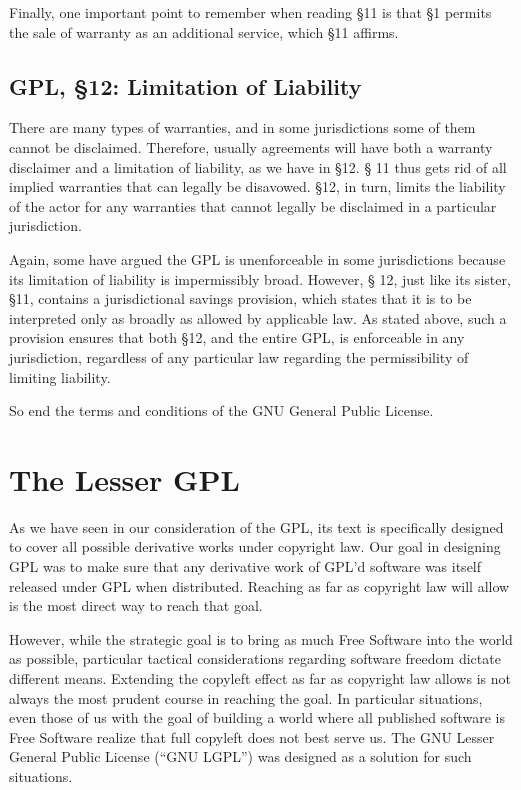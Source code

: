 \documentclass[11pt, letterpaper]{book}
\begin{document}
Finally, one important point to remember when reading \S 11 is that \S 1
permits the sale of warranty as an additional service, which \S 11 affirms.

\section{GPL, \S 12: Limitation of Liability}
\label{GPLs12}

There are many types of warranties, and in some jurisdictions some of them
cannot be disclaimed. Therefore, usually agreements will have both a
warranty disclaimer and a limitation of liability, as we have in \S 12. \S
11 thus gets rid of all implied warranties that can legally be
disavowed. \S 12, in turn, limits the liability of the actor for any
warranties that cannot legally be disclaimed in a particular jurisdiction.

Again, some have argued the GPL is unenforceable in some jurisdictions
because its limitation of liability is impermissibly broad. However, \S
12, just like its sister, \S 11, contains a jurisdictional savings
provision, which states that it is to be interpreted only as broadly as
allowed by applicable law. As stated above, such a provision ensures that
both \S 12, and the entire GPL, is enforceable in any jurisdiction,
regardless of any particular law regarding the permissibility of limiting
liability.

So end the terms and conditions of the GNU General Public License.

\chapter{The Lesser GPL}

As we have seen in our consideration of the GPL, its text is specifically
designed to cover all possible derivative works under copyright law. Our
goal in designing GPL was to make sure that any derivative work of GPL'd
software was itself released under GPL when distributed. Reaching as far
as copyright law will allow is the most direct way to reach that goal.

However, while the strategic goal is to bring as much Free Software
into the world as possible, particular tactical considerations
regarding software freedom dictate different means. Extending the
copyleft effect as far as copyright law allows is not always the most
prudent course in reaching the goal. In particular situations, even
those of us with the goal of building a world where all published
software is Free Software realize that full copyleft does not best
serve us. The GNU Lesser General Public License (``GNU LGPL'') was
designed as a solution for such situations.
\end{document}
